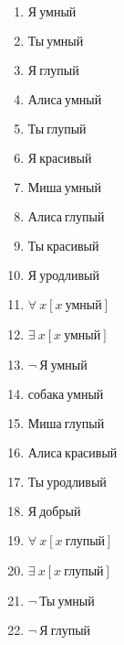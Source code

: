 \documentclass{article}
\begin{document}
\begin{enumerate}

\item $\text{Я} \ \text{умный}$

\item $\text{Ты} \ \text{умный}$

\item $\text{Я} \ \text{глупый}$

\item $\text{Алиса} \ \text{умный}$

\item $\text{Ты} \ \text{глупый}$

\item $\text{Я} \ \text{красивый}$

\item $\text{Миша} \ \text{умный}$

\item $\text{Алиса} \ \text{глупый}$

\item $\text{Ты} \ \text{красивый}$

\item $\text{Я} \ \text{уродливый}$

\item $\forall \ x[x \ \text{умный}]$

\item $\exists \ x[x \ \text{умный}]$

\item $\neg \ \text{Я} \ \text{умный}$

\item $\text{собака} \ \text{умный}$

\item $\text{Миша} \ \text{глупый}$

\item $\text{Алиса} \ \text{красивый}$

\item $\text{Ты} \ \text{уродливый}$

\item $\text{Я} \ \text{добрый}$

\item $\forall \ x[x \ \text{глупый}]$

\item $\exists \ x[x \ \text{глупый}]$

\item $\neg \ \text{Ты} \ \text{умный}$

\item $\neg \ \text{Я} \ \text{глупый}$


\end{enumerate}
\end{document}
